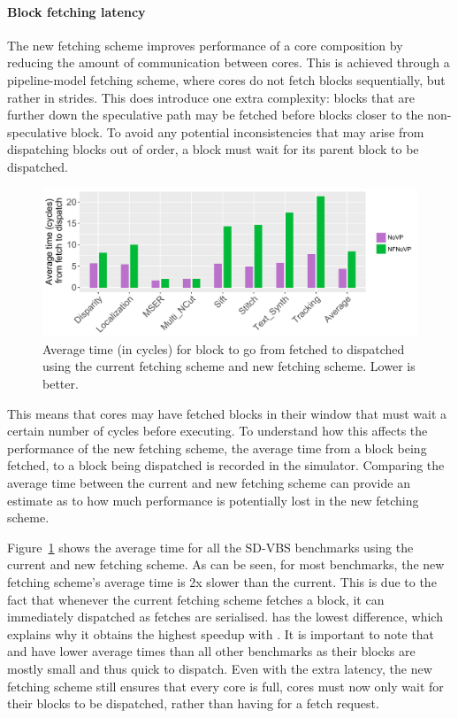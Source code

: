 \paragraph*{Block fetching latency}

The new fetching scheme improves performance of a core composition by reducing the amount of communication between cores.
This is achieved through a pipeline-model fetching scheme, where cores do not fetch blocks sequentially, but rather in strides.
This does introduce one extra complexity: blocks that are further down the speculative path may be fetched before blocks closer to the non-speculative block.
To avoid any potential inconsistencies that may arise from dispatching blocks out of order, a block must wait for its parent block to be dispatched.

\begin{figure}[t]
    \centering
    \includegraphics[width=1\textwidth]{chapter3/graphics/avTimeToFetch2.pdf}
    \caption{Average time (in cycles) for block to go from fetched to dispatched using the current fetching scheme and new fetching scheme. Lower is better.}
    \label{fig:av_time}
	\vspace{1em}
\end{figure}

This means that cores may have fetched blocks in their window that must wait a certain number of cycles before executing.
To understand how this affects the performance of the new fetching scheme, the average time from a block being fetched, to a block being dispatched is recorded in the simulator.
Comparing the average time between the current and new fetching scheme can provide an estimate as to how much performance is potentially lost in the new fetching scheme.

Figure~\ref{fig:av_time} shows the average time for all the SD-VBS benchmarks using the current and new fetching scheme.
As can be seen, for most benchmarks, the new fetching scheme's average time is 2x slower than the current.
This is due to the fact that whenever the current fetching scheme fetches a block, it can immediately dispatched as fetches are serialised.
 has the lowest difference, which explains why it obtains the highest speedup with \nfnovp{}.
It is important to note that  and  have lower average times than all other benchmarks as their blocks are mostly small and thus quick to dispatch.
Even with the extra latency, the new fetching scheme still ensures that every core is full, cores must now only wait for their blocks to be dispatched, rather than having for a fetch request.

